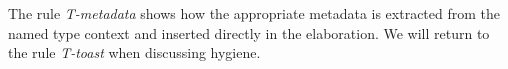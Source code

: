 The rule \textit{T-metadata} shows how the appropriate metadata is extracted from the named type context and inserted directly in the elaboration. We will return to the rule \textit{T-toast} when discussing hygiene.
